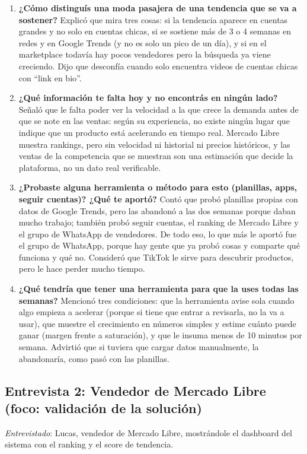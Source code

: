 \begin{enumerate}
	\item \textbf{¿Cómo distinguís una moda pasajera de una tendencia que se va a sostener?} Explicó que mira tres cosas: si la tendencia aparece en cuentas grandes y no solo en cuentas chicas, si se sostiene más de 3 o 4 semanas en redes y en Google Trends (y no es solo un pico de un día), y si en el marketplace todavía hay pocos vendedores pero la búsqueda ya viene creciendo. Dijo que desconfía cuando solo encuentra videos de cuentas chicas con ``link en bio''.
	\item \textbf{¿Qué información te falta hoy y no encontrás en ningún lado?} Señaló que le falta poder ver la velocidad a la que crece la demanda antes de que se note en las ventas: según su experiencia, no existe ningún lugar que indique que un producto está acelerando en tiempo real. Mercado Libre muestra rankings, pero sin velocidad ni historial ni precios históricos, y las ventas de la competencia que se muestran son una estimación que decide la plataforma, no un dato real verificable.
	\item \textbf{¿Probaste alguna herramienta o método para esto (planillas, apps, seguir cuentas)? ¿Qué te aportó?} Contó que probó planillas propias con datos de Google Trends, pero las abandonó a las dos semanas porque daban mucho trabajo; también probó seguir cuentas, el ranking de Mercado Libre y el grupo de WhatsApp de vendedores. De todo eso, lo que más le aportó fue el grupo de WhatsApp, porque hay gente que ya probó cosas y comparte qué funciona y qué no. Consideró que TikTok le sirve para descubrir productos, pero le hace perder mucho tiempo.
	\item \textbf{¿Qué tendría que tener una herramienta para que la uses todas las semanas?} Mencionó tres condiciones: que la herramienta avise sola cuando algo empieza a acelerar (porque si tiene que entrar a revisarla, no la va a usar), que muestre el crecimiento en números simples y estime cuánto puede ganar (margen frente a saturación), y que le insuma menos de 10 minutos por semana. Advirtió que si tuviera que cargar datos manualmente, la abandonaría, como pasó con las planillas.
\end{enumerate}

\subsection*{Entrevista 2: Vendedor de Mercado Libre (foco: validación de la solución)}

\emph{Entrevistado}: Lucas, vendedor de Mercado Libre, mostrándole el dashboard del sistema con el ranking y el score de tendencia.

